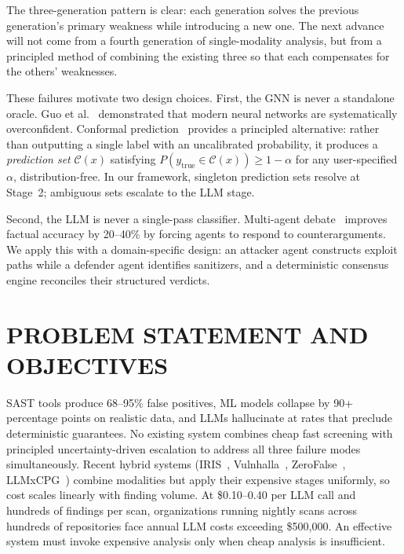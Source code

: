 The three-generation pattern is clear: each generation solves the previous generation's primary weakness while introducing a new one. The next advance will not come from a fourth generation of single-modality analysis, but from a principled method of combining the existing three so that each compensates for the others' weaknesses.

These failures motivate two design choices. First, the GNN is never a standalone oracle. Guo et al.~\cite{guocalibration2017} demonstrated that modern neural networks are systematically overconfident. Conformal prediction~\cite{angelopoulos2023, vovk2005} provides a principled alternative: rather than outputting a single label with an uncalibrated probability, it produces a \textit{prediction set} $\mathcal{C}(x)$ satisfying $P(y_{\text{true}} \in \mathcal{C}(x)) \geq 1 - \alpha$ for any user-specified $\alpha$, distribution-free. In our framework, singleton prediction sets resolve at Stage~2; ambiguous sets escalate to the LLM stage.

Second, the LLM is never a single-pass classifier. Multi-agent debate~\cite{multiagentdebate2023} improves factual accuracy by 20--40\% by forcing agents to respond to counterarguments. We apply this with a domain-specific design: an attacker agent constructs exploit paths while a defender agent identifies sanitizers, and a deterministic consensus engine reconciles their structured verdicts.


\section{\uppercase{Problem Statement and Objectives}}

SAST tools produce 68--95\% false positives, ML models collapse by 90+ percentage points on realistic data, and LLMs hallucinate at rates that preclude deterministic guarantees. No existing system combines cheap fast screening with principled uncertainty-driven escalation to address all three failure modes simultaneously. Recent hybrid systems (IRIS~\cite{iris2025}, Vulnhalla~\cite{vulnhalla2025}, ZeroFalse~\cite{zerofalse2025}, LLMxCPG~\cite{llmxcpg2025}) combine modalities but apply their expensive stages uniformly, so cost scales linearly with finding volume. At \$0.10--0.40 per LLM call and hundreds of findings per scan, organizations running nightly scans across hundreds of repositories face annual LLM costs exceeding \$500,000. An effective system must invoke expensive analysis only when cheap analysis is insufficient.

